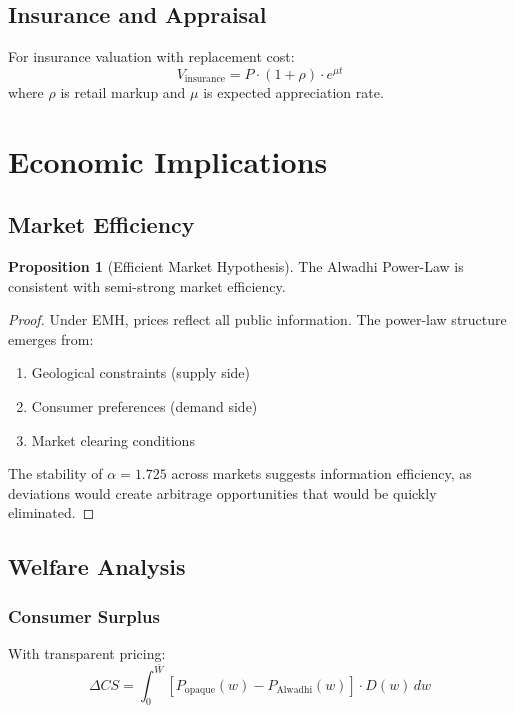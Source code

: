 \documentclass[12pt,a4paper]{article}
\theoremstyle{definition}
\newtheorem{proposition}{Proposition}
\theoremstyle{remark}
\begin{document}
\subsection{Insurance and Appraisal}

For insurance valuation with replacement cost:
\begin{equation}
V_{\text{insurance}} = P \cdot (1 + \rho) \cdot e^{\mu t}
\end{equation}
where $\rho$ is retail markup and $\mu$ is expected appreciation rate.

\section{Economic Implications}

\subsection{Market Efficiency}

\begin{proposition}[Efficient Market Hypothesis]
The Alwadhi Power-Law is consistent with semi-strong market efficiency.
\end{proposition}

\begin{proof}
Under EMH, prices reflect all public information. The power-law structure emerges from:
\begin{enumerate}
\item Geological constraints (supply side)
\item Consumer preferences (demand side)
\item Market clearing conditions
\end{enumerate}

The stability of $\alpha = 1.725$ across markets suggests information efficiency, as deviations would create arbitrage opportunities that would be quickly eliminated.
\end{proof}

\subsection{Welfare Analysis}

\subsubsection{Consumer Surplus}

With transparent pricing:
\begin{equation}
\Delta CS = \int_0^{\bar{W}} [P_{\text{opaque}}(w) - P_{\text{Alwadhi}}(w)] \cdot D(w) \, dw
\end{equation}
\end{document}
